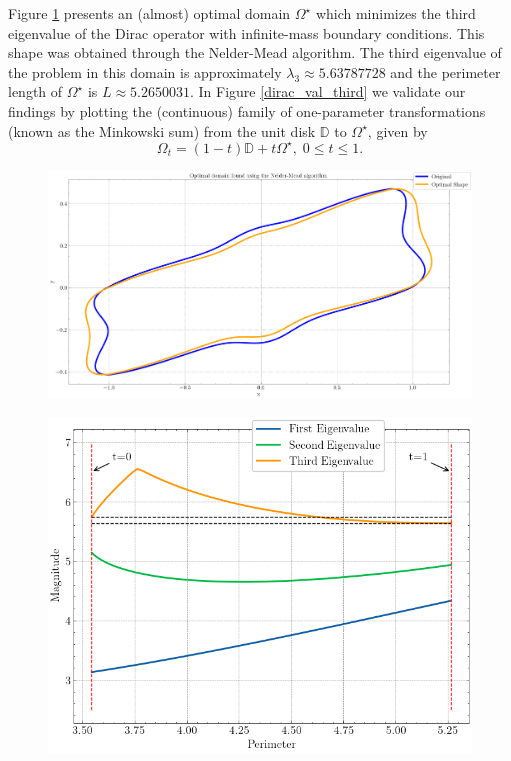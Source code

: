 Figure \ref{dirac_nelder_mead_domain} presents an (almost) optimal domain \(\Omega^\star\) which minimizes the third eigenvalue of the Dirac operator with infinite-mass boundary conditions. This shape was obtained through the Nelder-Mead algorithm. The third eigenvalue of the problem in this domain is approximately \(\lambda_3 \approx 5.63787728\) and the perimeter length of \(\Omega^\star\) is \(L \approx 5.2650031\). In Figure \ref{dirac_val_third} we validate our findings by plotting the (continuous) family of one-parameter transformations (known as the Minkowski sum) from the unit disk \(\mathbb{D}\) to \(\Omega^\star\), given by
\[
   \Omega_t = (1-t)\mathbb{D} + t \Omega^\star, \; 0 \leq t \leq 1.
\]
\begin{figure}[!htb]
    \centering
    \begin{minipage}{.5\textwidth}
        \centering
        \includegraphics[width=0.9\linewidth]{Images/Dirac/smooth/nelder_mead_optimal.png}
        \captionsetup{width=0.8\linewidth} %
        \label{dirac_nelder_mead_domain}
    \end{minipage}%
    \hfill
    \begin{minipage}{.5\textwidth}
        \centering
        \includegraphics[width=0.8\linewidth]{Images/Dirac/smooth/dirac_val_third.png}

\end{minipage}
\end{figure}
